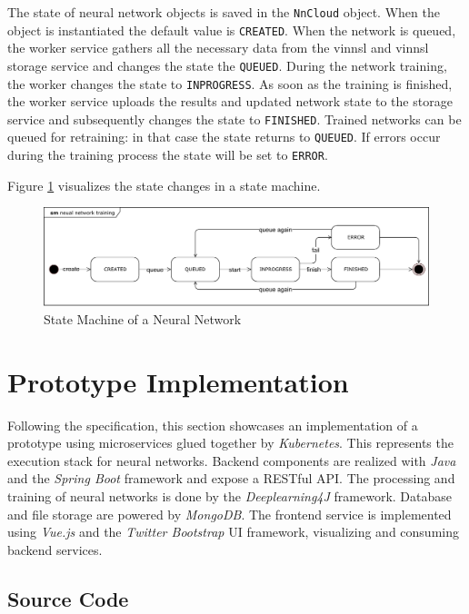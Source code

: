 The state of neural network objects is saved in the \texttt{NnCloud}
object. When the object is instantiated the default value is
\texttt{CREATED}. When the network is queued, the worker service gathers
all the necessary data from the vinnsl and vinnsl storage service and
changes the state the \texttt{QUEUED}. During the network training, the
worker changes the state to \texttt{INPROGRESS}. As soon as the training
is finished, the worker service uploads the results and updated network
state to the storage service and subsequently changes the state to
\texttt{FINISHED}. Trained networks can be queued for retraining: in
that case the state returns to \texttt{QUEUED}. If errors occur during
the training process the state will be set to \texttt{ERROR}.

Figure \ref{nn-states} visualizes the state changes in a state machine.

\begin{figure}
\centering
\includegraphics[width=15.00000cm]{images/nn-states}
\caption{State Machine of a Neural Network \label{nn-states}}
\end{figure}

\chapter{Prototype Implementation}\label{prototype-implementation}

Following the specification, this section showcases an implementation of
a prototype using microservices glued together by \emph{Kubernetes}.
This represents the execution stack for neural networks. Backend
components are realized with \emph{Java} and the \emph{Spring Boot}
framework and expose a RESTful API. The processing and training of
neural networks is done by the \emph{Deeplearning4J} framework. Database
and file storage are powered by \emph{MongoDB}. The frontend service is
implemented using \emph{Vue.js} and the \emph{Twitter Bootstrap} UI
framework, visualizing and consuming backend services.

\section{Source Code}\label{source-code-1}

